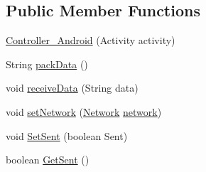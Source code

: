 \subsection*{Public Member Functions}
\begin{DoxyCompactItemize}
\item 
\hyperlink{classswp_1_1tuilmenau_1_1carduinodroid_1_1controller_1_1_controller___android_adf73ebedd13a290596953bc235ac73ba}{Controller\+\_\+\+Android} (Activity activity)
\item 
String \hyperlink{classswp_1_1tuilmenau_1_1carduinodroid_1_1controller_1_1_controller___android_ac8e21f14d9ed1c31500904a4f2a89242}{pack\+Data} ()
\item 
void \hyperlink{classswp_1_1tuilmenau_1_1carduinodroid_1_1controller_1_1_controller___android_aee7580998e493c8fafa0ddd0dff31704}{receive\+Data} (String data)
\item 
void \hyperlink{classswp_1_1tuilmenau_1_1carduinodroid_1_1controller_1_1_controller___android_ae6de91d0d2653cfd019a473cfe8714a1}{set\+Network} (\hyperlink{classswp_1_1tuilmenau_1_1carduinodroid_1_1controller_1_1_network}{Network} \hyperlink{classswp_1_1tuilmenau_1_1carduinodroid_1_1controller_1_1_controller___android_af9cb0b01ab817f064e722a70b0a07987}{network})
\item 
void \hyperlink{classswp_1_1tuilmenau_1_1carduinodroid_1_1controller_1_1_controller___android_aa5f10c125c12e42da6b8eec6d922c7d1}{Set\+Sent} (boolean Sent)
\item 
boolean \hyperlink{classswp_1_1tuilmenau_1_1carduinodroid_1_1controller_1_1_controller___android_ad9b71a18c5f0c004ced9b939c144a3da}{Get\+Sent} ()
\end{DoxyCompactItemize}
